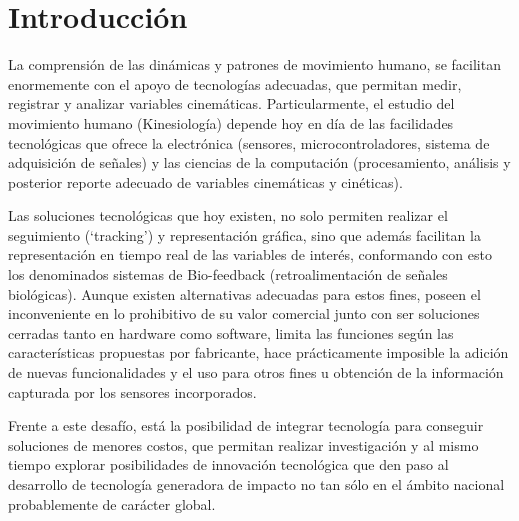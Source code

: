 \documentclass[12pt,a4paper]{article}
\begin{document}
			
			\pagebreak
			
			
			
			
			\tableofcontents %
			\listoffigures
			\listoftables
			
			\thispagestyle{empty}
			\pagebreak
			
			\let\stdsection\section
			\renewcommand\section{\newpage\stdsection}
			
			
			
			\section{Introducción}
			La comprensión de las dinámicas y patrones de movimiento humano, se facilitan enormemente con el apoyo de tecnologías adecuadas, que permitan medir, registrar y analizar variables cinemáticas. Particularmente, el estudio del movimiento humano (Kinesiología) depende hoy en día de las facilidades tecnológicas que ofrece la electrónica (sensores, microcontroladores, sistema de adquisición de señales) y las ciencias de la computación (procesamiento, análisis y posterior reporte adecuado de  variables cinemáticas y cinéticas).  
			
			Las soluciones tecnológicas que hoy existen, no solo permiten realizar el seguimiento (‘tracking’) y representación gráfica, sino que además facilitan la representación en tiempo real de las variables de interés, conformando con esto los denominados sistemas de Bio-feedback (retroalimentación de señales biológicas). Aunque existen alternativas adecuadas para estos fines, poseen el inconveniente en lo prohibitivo de su valor comercial junto con ser soluciones cerradas tanto en hardware como software, limita las funciones según las características propuestas por fabricante, hace prácticamente imposible la adición de nuevas funcionalidades y el uso para otros fines u obtención de la información capturada por los sensores incorporados.
			
			Frente a este desafío, está la posibilidad de integrar tecnología para conseguir soluciones de menores costos, que permitan realizar investigación y al mismo tiempo explorar posibilidades de innovación tecnológica que den paso al desarrollo de tecnología generadora de impacto no tan sólo en el ámbito nacional probablemente de carácter global.
			
\end{document}

